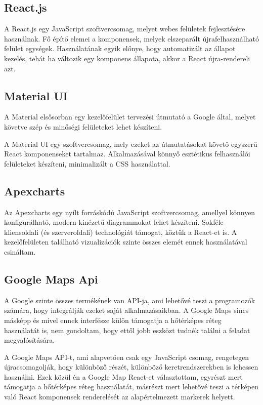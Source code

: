 \subsection{React.js}
A React.js\cite{react} egy JavaScript szoftvercsomag, melyet webes felületek fejlesztésére használnak.
Fő építő elemei a komponensek, melyek elszeparált újrafelhasználható felület egységek.
Használatának egyik előnye, hogy automatizált az állapot kezelés, tehát ha változik egy komponens állapota, akkor a React újra-rendereli azt.

\subsection{Material UI}
A Material\cite{material} elsősorban egy kezelőfelület tervezési útmutató a Google által, melyet követve szép és minőségi felületeket lehet készíteni.

A Material UI\cite{material-ui} egy szoftvercsomag, mely ezeket az útmutatásokat követő egyszerű React komponenseket tartalmaz.
Alkalmazásával könnyő esztétikus felhasználói felületeket készíteni, minimalizált a CSS használattal. 

\subsection{Apexcharts}
Az Apexcharts\cite{apexcharts} egy nyílt forráskódú JavaScript szoftvercsomag, amellyel könnyen konfigurálható, modern kinézetű diagrammokat lehet készíteni.
Sokféle kliensoldali (és szerveroldali) technológiát támogat, köztük a React-et is. A kezelőfelületen található vizualizációk szinte összes elemét ennek használatával csináltam.

\subsection{Google Maps Api}
A Google szinte összes termékének van API-ja, ami lehetővé teszi a programozók számára, hogy integrálják ezeket saját alkalmazásaikban.
A Google Maps sincs másképp és mivel ennek interfésze külön támogatja a hőtérképes réteg használatát is, nem gondoltam, hogy ettől jobb eszközt tudnék találni a feladat megvalósítására.

A Google Maps API-t, ami alapvetően csak egy JavaScript csomag, rengetegen újracsomagolják, hogy különböző részét, különböző keretrendszerekben is lehessen használni.
Ezek közül én a Google Map React\cite{google-map-react}-et választottam, egyrészt mert támogatja a hőtérképes réteg használatát, 
másrészt mert lehetővé teszi a térképen való React komponensek renderelését az alapértelmezett markerek helyett.